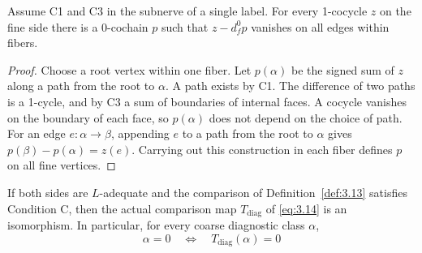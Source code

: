 \begin{lemma}\label{lem:3.16}

Assume C1 and C3 in the subnerve of a single label. For every 1-cocycle $z$ on the
fine side there is a 0-cochain $p$ such that $z-d_f^0p$ vanishes on all edges within
fibers.

\end{lemma}

\begin{proof}

Choose a root vertex within one fiber.
Let $p(\alpha)$ be the signed sum of $z$ along a path from the root to $\alpha$.
A path exists by C1. The difference of two paths is a 1-cycle, and by C3 a sum of
boundaries of internal faces.
A cocycle vanishes on the boundary of each face, so $p(\alpha)$ does not depend on
the choice of path.
For an edge $e:\alpha\to\beta$, appending $e$ to a path from the root to $\alpha$
gives $p(\beta)-p(\alpha)=z(e)$.
Carrying out this construction in each fiber defines $p$ on all fine vertices.

\end{proof}

\begin{theorem}\label{thm:3.17}

If both sides are $L$-adequate and the comparison of Definition~\ref{def:3.13}
satisfies Condition C, then the actual comparison map $T_{\mathrm{diag}}$ of
\eqref{eq:3.14} is an isomorphism.
In particular, for every coarse diagnostic class $\alpha$,
\begin{equation*}
\alpha=0\quad\Longleftrightarrow\quad T_{\mathrm{diag}}(\alpha)=0
\tag{3.15}\label{eq:3.15}
\end{equation*}
\end{theorem}

